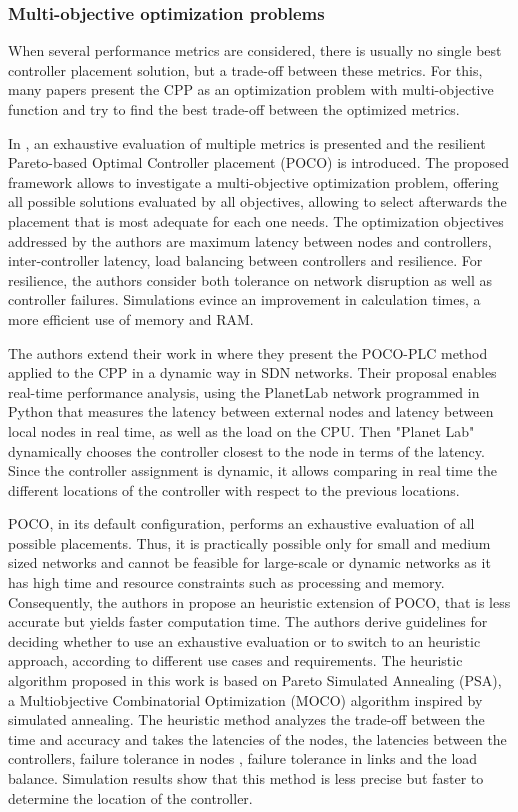 \documentclass{IEEEtran}
\begin{document}
\subsubsection{Multi-objective optimization problems}
When several performance metrics are considered, there is usually no single best controller placement solution, but a trade-off between these metrics. For this, many papers present the CPP as an optimization problem with multi-objective function and try to find the best trade-off between the optimized metrics.

In \cite{HoHa13}, an exhaustive evaluation of multiple metrics is presented and the resilient Pareto-based Optimal Controller placement (POCO) is introduced. The proposed framework allows to investigate a multi-objective optimization problem, offering all possible solutions evaluated by all objectives, allowing to select afterwards the placement that is most adequate for each one needs. The optimization objectives addressed by the authors are maximum latency between nodes and controllers, inter-controller latency, load balancing between controllers and resilience. For resilience, the authors consider both tolerance on network disruption as well as controller failures. Simulations evince an improvement in calculation times, a more efficient use of memory and RAM.

The authors extend their work in \cite{HoHa14} where they present the POCO-PLC method applied to the CPP in a dynamic way in SDN networks. Their proposal enables real-time performance analysis, using the PlanetLab network programmed in Python that measures the latency between external nodes and latency between local nodes in real time, as well as the load on the CPU. Then "Planet Lab" dynamically chooses the controller closest to the node in terms of the latency. Since the controller assignment is dynamic, it allows comparing in real time the different locations of the controller with respect to the previous locations.

POCO, in its default configuration, performs an exhaustive evaluation of all possible placements. Thus, it is practically possible only for small and medium sized networks and cannot be feasible for large-scale or dynamic networks as it has high time and resource constraints such as processing and memory. 
Consequently, the authors in \cite{LaGe15} propose an heuristic extension of POCO, that is less accurate but yields faster computation time. The authors derive guidelines for deciding whether to use an exhaustive evaluation or to switch to an heuristic approach, according to different use cases and requirements. The heuristic algorithm proposed in this work is based on Pareto Simulated Annealing (PSA), a Multiobjective Combinatorial Optimization (MOCO) algorithm inspired by simulated annealing. The heuristic method analyzes the trade-off between the time and accuracy and takes the latencies of the nodes, the latencies between the controllers, failure tolerance in nodes , failure tolerance in links and the load balance. Simulation results show that this method is less precise but faster to determine the location of the controller.
\end{document}

